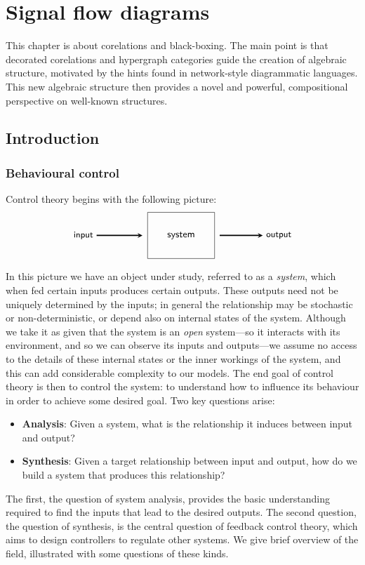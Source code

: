 \chapter{Signal flow diagrams}
This chapter is about corelations and black-boxing. The main point is that
decorated corelations and hypergraph categories guide the creation of algebraic
structure, motivated by the hints found in network-style diagrammatic languages.
This new algebraic structure then provides a novel and powerful, compositional
perspective on well-known structures.

\section{Introduction}
\subsection{Behavioural control}

Control theory begins with the following picture:		
\[
\begin{tikzpicture}
\node(system) [shape=rectangle,draw,inner sep=20pt] at (0,0) {\textsf{system}};
\node(input) at (-3.5,0) {\small{\textsf{input}}};
\node(output) at (3.5,0) {\small{\textsf{output}}};
\draw [->,shorten >=5pt,>=stealth,very thick] (input) 	-- (system);
\draw [->,shorten <=5pt,>=stealth,very thick] (system)	-- (output);
\end{tikzpicture}
\]
In this picture we have an object under study, referred to as a \emph{system}, which when fed certain inputs produces certain outputs. These outputs need not be uniquely determined by the inputs; in general the relationship may be stochastic or non-deterministic, or depend also on internal states of the system. Although we take it as given that the system is an \emph{open} system---so it interacts with its environment, and so we can observe its inputs and outputs---we assume no access to the details of these internal states or the inner workings of the system, and this can add considerable complexity to our models. The end goal of control theory is then to control the system: to understand how to influence its behaviour in order to achieve some desired goal. Two key questions arise: 
\begin{itemize}
\item \textbf{Analysis}: Given a system, what is the relationship it induces between input and output?
\item \textbf{Synthesis}: Given a target relationship between input and output, how do we build a system that produces this relationship?
\end{itemize}
The first, the question of system analysis, provides the basic understanding required to find the inputs that lead to the desired outputs. The second question, the question of synthesis, is the central question of feedback control theory, which aims to design controllers to regulate other systems. We give brief overview of the field, illustrated with some questions of these kinds.

